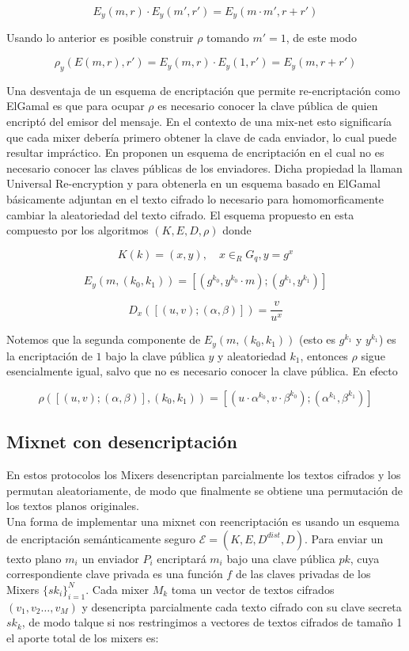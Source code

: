 $$ E_{y}(m,r) \cdot E_{y}(m',r') = E_{y}(m \cdot m', r+r')$$


Usando lo anterior es posible construir $\rho$ tomando $m'=1$, de este
modo

$$\rho_{y}(E(m,r),r') = E_{y}(m,r) \cdot E_{y}(1,r') = E_{y}(m,r+r')$$

Una desventaja de un esquema de encriptación que permite re-encriptación
como ElGamal es que para ocupar $\rho$ es necesario conocer la clave pública
de quien encriptó del emisor del mensaje. En el contexto de una mix-net esto
significaría que cada mixer debería primero obtener la clave de cada
enviador, lo cual puede resultar impráctico.
En \cite{GolleEtAl04}
proponen un esquema de encriptación en el cual no es necesario conocer
las claves públicas de los enviadores. Dicha propiedad la llaman Universal
Re-encryption y para obtenerla en un esquema basado en ElGamal básicamente
adjuntan en el texto cifrado lo necesario para homomorficamente cambiar
la aleatoriedad del texto cifrado. El esquema propuesto en \cite{GolleEtAl04}
esta compuesto por los algoritmos $(K,E,D,\rho)$ donde

$$K(k)=(x,y),\quad x\in_{R} G_{q},  y=g^{x}$$


$$E_{y}(m,(k_{0},k_{1}))=[(g^{k_{0}},y^{k_{0}}\cdot m);(g^{k_{1}},y^{k_{1}})]$$


$$D_{x}([(u,v);(\alpha,\beta)])=\frac{v}{u^{x}}$$


Notemos que la segunda componente de $E_{y}(m,(k_{0},k_{1}))$ (esto es $g^{k_1}$ y $y^{k_1}$)
es la encriptación de $1$ bajo la clave pública $y$ y aleatoriedad
$k_{1}$, entonces $\rho$ sigue esencialmente igual, salvo que no es necesario
conocer la clave pública. En efecto

$$
\rho([(u,v);(\alpha,\beta)],(k_{0},k_{1}))=
[(u\cdot \alpha^{k_{0}}, v\cdot \beta^{k_{0}});
 (\alpha^{k_{1}},\beta^{k_{1}})]
$$

\subsection{Mixnet con desencriptación}

En estos protocolos los Mixers desencriptan parcialmente los textos
cifrados y los permutan aleatoriamente, de modo que finalmente se
obtiene una permutación de los textos planos originales.\\
Una forma de implementar una mixnet con reencriptación es usando un
esquema de encriptación semánticamente seguro
$\mathcal{E}=(K,E,D^{dist},D)$. Para enviar un texto plano $m_{i}$ un enviador
$P_{i}$  encriptará $m_{i}$ bajo una clave
pública $pk$, cuya correspondiente clave privada es una función $f$
de las claves privadas de los Mixers $\{sk_{i}\}_{i=1}^{N}$.
Cada mixer $M_{k}$ toma un vector
de textos cifrados $(v_{1},v_{2}\ldots,v_{M})$ y desencripta parcialmente cada
texto cifrado con su clave secreta $sk_{k}$, de modo talque si nos restringimos
a vectores de textos cifrados de tamaño 1 el aporte
total de los mixers es:

